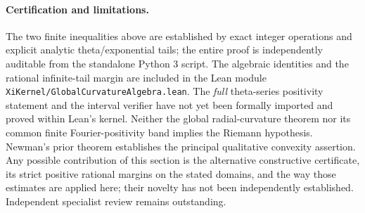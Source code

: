 \paragraph{Certification and limitations.}
The two finite inequalities above are
established by exact integer operations and
explicit analytic theta/exponential tails;
the entire proof is independently auditable
from the standalone Python 3 script.
The algebraic identities and the rational
infinite-tail margin are included in the
Lean module
\texttt{XiKernel/GlobalCurvatureAlgebra.lean}.
The \emph{full} theta-series positivity
statement and the interval verifier have
not yet been formally imported and proved
within Lean's kernel.
Neither the global radial-curvature theorem
nor its common finite Fourier-positivity
band implies the Riemann hypothesis.
Newman's prior theorem \cite{NewmanGHS} establishes
the principal qualitative convexity assertion.
Any possible contribution of this section is the
alternative constructive certificate, its strict
positive rational margins on the stated domains,
and the way those estimates are applied here;
their novelty has not been independently established.
Independent specialist review remains outstanding.
